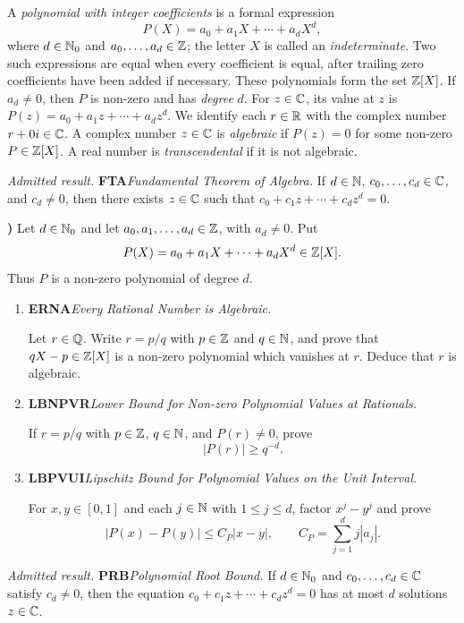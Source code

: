 \documentclass[10pt,a4paper]{article}
\newcounter{examquestion}
\newcommand{\examquestion}[1]{%
  \Needspace{5\baselineskip}%
  \refstepcounter{examquestion}%
  \par\addvspace{0.8\baselineskip}%
  \noindent\textbf{\theexamquestion)}\enspace #1\par
}
\newenvironment{subquestions}
  {\begin{enumerate}[label=\alph*),leftmargin=2.1em]}
  {\end{enumerate}}
\newcommand{\nameditem}[2]{%
  \textbf{\textsf{#1}}\enspace\emph{#2.}\enspace
}
\newcommand{\admitted}[3]{%
  \par\smallskip\noindent\emph{Admitted result.}\enspace
  \nameditem{#1}{#2}#3\par
}
\begin{document}
A \emph{polynomial with integer coefficients} is a formal expression
\[
  P(X)=a_0+a_1X+\cdots+a_dX^d,
\]
where $d\in\mathbb{N}_0$ and $a_0,\ldots,a_d\in\mathbb{Z}$; the letter $X$ is called an
\emph{indeterminate}.  Two such expressions are equal when every
coefficient is equal, after trailing zero coefficients have been added if
necessary.  These polynomials form the set $\mathbb{Z}[X]$.  If
$a_d\ne0$, then $P$ is non-zero and has \emph{degree} $d$.  For
$z\in\mathbb{C}$, its value at $z$ is
$P(z)=a_0+a_1z+\cdots+a_dz^d$.  We identify each $r\in\mathbb{R}$ with the
complex number $r+0i\in\mathbb{C}$.  A complex
number $z\in\mathbb{C}$ is \emph{algebraic} if $P(z)=0$ for some non-zero
$P\in\mathbb{Z}[X]$.  A real number is \emph{transcendental} if it is not
algebraic.

\admitted{FTA}{Fundamental Theorem of Algebra}{If $d\in\mathbb{N}$,
$c_0,\ldots,c_d\in\mathbb{C}$, and $c_d\ne0$, then there exists $z\in\mathbb{C}$ such
that $c_0+c_1z+\cdots+c_dz^d=0$.}

\examquestion{\label{q:algebraic-estimates}
Let $d\in\mathbb{N}_0$ and let $a_0,a_1,\ldots,a_d\in\mathbb{Z}$, with $a_d\ne0$.
Put
\[
  P(X)=a_0+a_1X+\cdots+a_dX^d\in\mathbb{Z}[X].
\]
Thus $P$ is a non-zero polynomial of degree $d$.
\begin{subquestions}
  \item \nameditem{ERNA}{Every Rational Number is Algebraic}
  Let $r\in\mathbb{Q}$.  Write $r=p/q$ with $p\in\mathbb{Z}$ and $q\in\mathbb{N}$, and
  prove that $qX-p\in\mathbb{Z}[X]$ is a non-zero polynomial which vanishes at
  $r$.  Deduce that $r$ is algebraic.
  \item \nameditem{LBNPVR}{Lower Bound for Non-zero Polynomial Values at Rationals}
  If $r=p/q$ with $p\in\mathbb{Z}$, $q\in\mathbb{N}$, and $P(r)\ne0$, prove
  \[
    |P(r)|\geq q^{-d}.
  \]
  \item \nameditem{LBPVUI}{Lipschitz Bound for Polynomial Values on the Unit Interval}
  For $x,y\in[0,1]$ and each $j\in\mathbb{N}$ with $1\leq j\leq d$,
  factor $x^j-y^j$ and prove
  \[
    |P(x)-P(y)|\leq C_P|x-y|,
    \qquad C_P=\sum_{j=1}^d j|a_j|.
  \]
\end{subquestions}}

\admitted{PRB}{Polynomial Root Bound}{If $d\in\mathbb{N}_0$ and
$c_0,\ldots,c_d\in\mathbb{C}$ satisfy $c_d\ne0$, then the equation
$c_0+c_1z+\cdots+c_dz^d=0$ has at most $d$ solutions $z\in\mathbb{C}$.}
\end{document}
